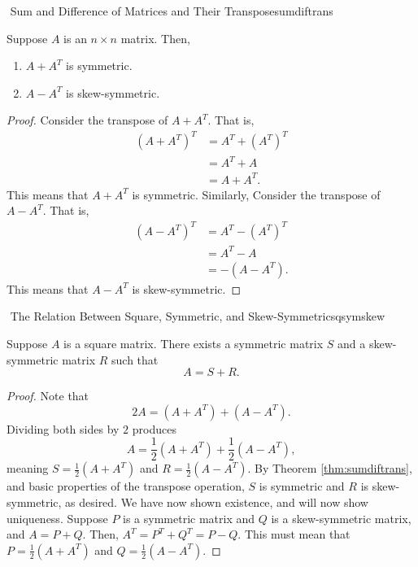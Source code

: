         \begin{theorem}{\Stop\,\,Sum and Difference of Matrices and Their Transpose}{sumdiftrans}
        
            Suppose \(A\) is an \(n\times n\) matrix. Then,
            \begin{enumerate}
                \item \(A+A^T\) is symmetric.
                \item \(A-A^T\) is skew-symmetric.
            \end{enumerate}
            \begin{proof}
                Consider the transpose of \(A+A^T\). That is,
                \begin{align*}
                    (A+A^T)^T&=A^T+(A^T)^T \\
                    &=A^T+A \\
                    &=A+A^T.
                \end{align*}
                This means that \(A+A^T\) is symmetric. Similarly, Consider the transpose of \(A-A^T\). That is,
                \begin{align*}
                    (A-A^T)^T&=A^T-(A^T)^T \\
                    &=A^T-A \\
                    &=-(A-A^T).
                \end{align*}
                This means that \(A-A^T\) is skew-symmetric.
            \end{proof}
        \end{theorem}
        \begin{theorem}{\Stop\,\,The Relation Between Square, Symmetric, and Skew-Symmetric}{sqsymskew}
        
            Suppose \(A\) is a square matrix. There exists a symmetric matrix \(S\) and a skew-symmetric matrix \(R\) such that
            \begin{equation*}
                A=S+R.
            \end{equation*}
            \begin{proof}
                Note that
                \begin{equation*}
                    2A=(A+A^T)+(A-A^T).
                \end{equation*}
                Dividing both sides by \(2\) produces
                \begin{equation*}
                    A=\frac{1}{2}(A+A^T)+\frac{1}{2}(A-A^T),
                \end{equation*}
                meaning \(S=\frac{1}{2}(A+A^T)\) and \(R=\frac{1}{2}(A-A^T)\). By Theorem \ref{thm:sumdiftrans}, and basic properties of the transpose operation, \(S\) is symmetric and \(R\) is skew-symmetric, as desired. We have now shown existence, and will now show uniqueness. Suppose \(P\) is a symmetric matrix and \(Q\) is a skew-symmetric matrix, and \(A=P+Q\). Then, \(A^T=P^T+Q^T=P-Q\). This must mean that \(P=\frac{1}{2}(A+A^T)\) and \(Q=\frac{1}{2}(A-A^T)\).
            \end{proof}
        \end{theorem}
        
